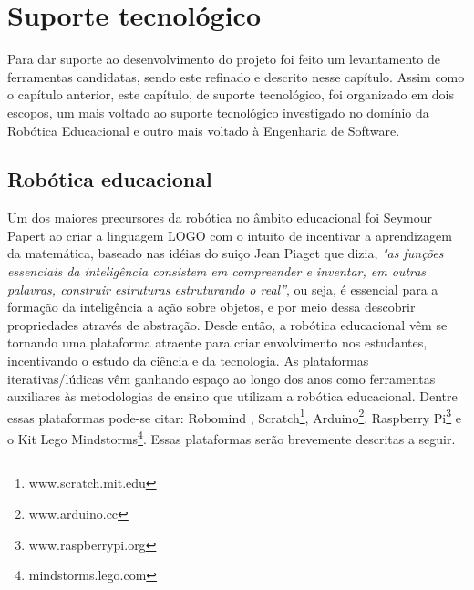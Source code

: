 \chapter{Suporte tecnológico} \label{suportetecnologico}
Para dar suporte ao desenvolvimento do projeto foi feito um levantamento de ferramentas candidatas, sendo este refinado e descrito nesse capítulo. Assim como o capítulo anterior, este capítulo, de suporte tecnológico, foi organizado em dois escopos, um mais voltado ao suporte tecnológico investigado no domínio da Robótica Educacional e outro mais voltado à Engenharia de Software.

\section{Robótica educacional}
Um dos maiores precursores da robótica no âmbito educacional foi Seymour Papert ao criar a  linguagem LOGO com o intuito de incentivar a aprendizagem da matemática, baseado nas idéias do suiço Jean Piaget que dizia, \textit{"as funções essenciais da inteligência consistem em compreender e inventar, em outras palavras, construir estruturas estruturando o real”}, ou seja, é essencial para a formação da inteligência a ação sobre objetos, e por meio dessa descobrir propriedades através de abstração.
Desde então, a robótica educacional vêm se tornando uma plataforma atraente para criar envolvimento nos estudantes, incentivando o estudo da ciência e da tecnologia. 
As plataformas iterativas/lúdicas vêm ganhando espaço ao longo dos anos como ferramentas auxiliares às metodologias de ensino que utilizam a robótica educacional. Dentre essas plataformas pode-se citar: Robomind \cite{Robomind}, Scratch\footnote{www.scratch.mit.edu}, Arduino\footnote{www.arduino.cc}, Raspberry Pi\footnote{www.raspberrypi.org} e o Kit Lego Mindstorms\footnote{mindstorms.lego.com}. Essas plataformas serão brevemente descritas a seguir.

